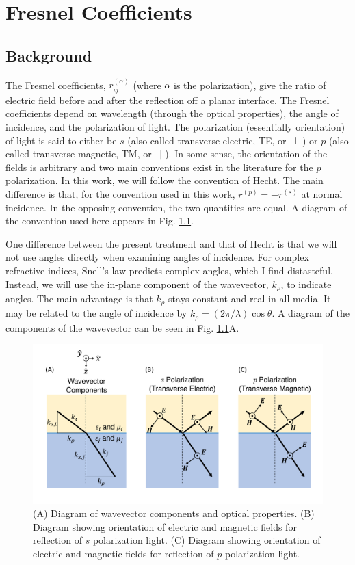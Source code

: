 \chapter[Fresnel Coefficients][Fresnel Coefficients]{Fresnel Coefficients}\label{ap:FresnelCoefficients}

\section{Background}
%
The Fresnel coefficients, $r^{(\alpha)}_{ij}$ (where $\alpha$ is the polarization), give the ratio of electric field before and after the reflection off a planar interface. The Fresnel coefficients depend on wavelength (through the optical properties), the angle of incidence, and the polarization of light. The polarization (essentially orientation) of light is said to either be $s$ (also called transverse electric, TE, or $\perp$) or $p$ (also called transverse magnetic, TM, or $\parallel$). In some sense, the orientation of the fields is arbitrary and two main conventions exist in the literature for the $p$ polarization. In this work, we will follow the convention of Hecht.\cite{Hecht2017} The main difference is that, for the convention used in this work, $r^{(p)} = - r^{(s)} $ at normal incidence. In the opposing convention, the two quantities are equal. A diagram of the convention used here appears in Fig. \ref{fig:FieldConvention}.

One difference between the present treatment and that of Hecht is that we will not use angles directly when examining angles of incidence. For complex refractive indices, Snell's law predicts complex angles, which I find distasteful. Instead, we will use the in-plane component of the wavevector, $k_{\rho}$, to indicate angles. The main advantage is that $k_{\rho}$ stays constant and real in all media. It may be related to the angle of incidence by $k_{\rho} = (2 \pi /\lambda) \cos{\theta}$. A diagram of the components of the wavevector can be seen in Fig. \ref{fig:FieldConvention}A.

\begin{figure}
\centering
\includegraphics[width=1.0\textwidth]{./Figures/ReflectionConvention.pdf}
\caption{\label{fig:FieldConvention}(A) Diagram of wavevector components and optical properties. (B) Diagram showing orientation of electric and magnetic fields for reflection of $s$ polarization light. (C) Diagram showing orientation of electric and magnetic fields for reflection of $p$ polarization light. }
\end{figure}

